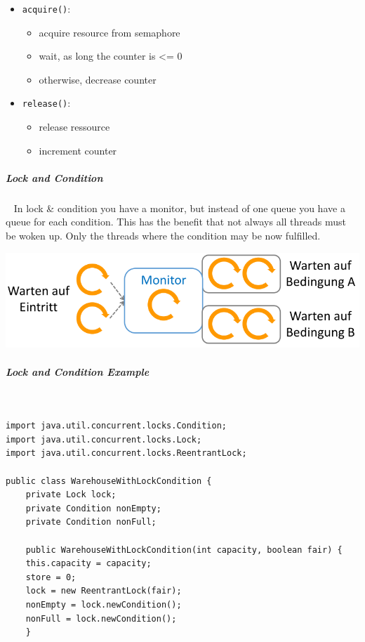 \documentclass[11pt,twoside,landscape]{article}
\begin{document}
\begin{multicols}{3}
\begin{itemize}
\item \texttt{acquire()}:
\begin{itemize}
\item acquire resource from semaphore
\item wait, as long the counter is <= 0
\item otherwise, decrease counter
\end{itemize}
\item \texttt{release()}:
\begin{itemize}
\item release ressource
\item increment counter
\end{itemize}
\end{itemize}

\subparagraph{Lock and Condition} \
\label{sec:org19c71ef}
In lock \& condition you have a monitor, but instead of one queue you have a queue for each condition.
This has the benefit that not always all threads must be woken up.
Only the threads where the condition may be now fulfilled.

{
\begin{center}
\includegraphics[width=.9\linewidth]{img/lock_and_conditions.png}
\end{center}
\label{fig:lock-and-conditions}
}

\subparagraph{Lock and Condition Example} \
\label{sec:orgbaffbca}
\lstset{language=java,label= ,caption= ,captionpos=b,numbers=none}
\begin{lstlisting}
import java.util.concurrent.locks.Condition;
import java.util.concurrent.locks.Lock;
import java.util.concurrent.locks.ReentrantLock;

public class WarehouseWithLockCondition {
    private Lock lock;
    private Condition nonEmpty;
    private Condition nonFull;

    public WarehouseWithLockCondition(int capacity, boolean fair) {
	this.capacity = capacity;
	store = 0;
	lock = new ReentrantLock(fair);
	nonEmpty = lock.newCondition();
	nonFull = lock.newCondition();
    }


\end{lstlisting}
\end{multicols}
\end{document}
